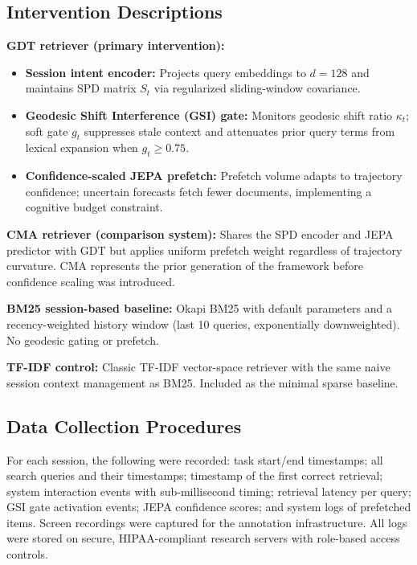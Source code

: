 \documentclass[11pt]{article}
\begin{document}
\subsection{Intervention Descriptions}

\textbf{GDT retriever (primary intervention):}
\begin{itemize}
  \item \textbf{Session intent encoder:} Projects query embeddings to $d=128$ and maintains SPD matrix $S_t$ via regularized sliding-window covariance.
  \item \textbf{Geodesic Shift Interference (GSI) gate:} Monitors geodesic shift ratio $\kappa_t$; soft gate $g_t$ suppresses stale context and attenuates prior query terms from lexical expansion when $g_t \geq 0.75$.
  \item \textbf{Confidence-scaled JEPA prefetch:} Prefetch volume adapts to trajectory confidence; uncertain forecasts fetch fewer documents, implementing a cognitive budget constraint.
\end{itemize}

\textbf{CMA retriever (comparison system):}
Shares the SPD encoder and JEPA predictor with GDT but applies uniform prefetch weight regardless of trajectory curvature. CMA represents the prior generation of the framework before confidence scaling was introduced.

\textbf{BM25 session-based baseline:}
Okapi BM25 \citep{robertson1995,robertson1976} with default parameters and a recency-weighted history window (last 10 queries, exponentially downweighted). No geodesic gating or prefetch.

\textbf{TF-IDF control:}
Classic TF-IDF vector-space retriever \citep{salton83} with the same naive session context management as BM25. Included as the minimal sparse baseline.

\subsection{Data Collection Procedures}
For each session, the following were recorded: task start/end timestamps; all search queries and their timestamps; timestamp of the first correct retrieval; system interaction events with sub-millisecond timing; retrieval latency per query; GSI gate activation events; JEPA confidence scores; and system logs of prefetched items. Screen recordings were captured for the annotation infrastructure. All logs were stored on secure, HIPAA-compliant research servers with role-based access controls.
\end{document}
